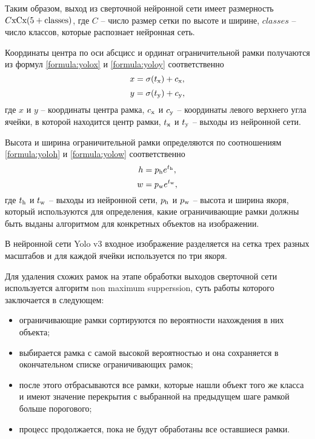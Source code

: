 Таким образом, выход из сверточной нейронной сети имеет размерность $C\rm{x}C\rm{x}(5+classes)$, где $C$ -- число размер сетки по высоте и ширине, $classes$ -- число классов, которые распознает нейронная сеть.

Координаты центра по оси абсцисс и ординат ограничительной рамки получаются из формул \ref{formula:yolox} и \ref{formula:yoloy} соответственно
\begin{equation}\label{formula:yolox}
x = \sigma(t_{\rm{x}}) + c_{\rm{x}},
\end{equation}
\begin{equation}\label{formula:yoloy}
y = \sigma(t_{\rm{y}}) + c_{\rm{y}},
\end{equation}
где $x$ и $y$ -- координаты центра рамка, $c_{\rm{x}}$ и $c_{\rm{y}}$ -- координаты левого верхнего угла ячейки, в которой находится центр рамки, $t_{\rm{x}}$ и $t_{\rm{y}}$ -- выходы из нейронной сети.

Высота и ширина ограничительной рамки определяются по соотношениям \ref{formula:yoloh} и \ref{formula:yolow} соответственно
\begin{equation}\label{formula:yoloh}
h =  p_{\rm{h}}e^{t_{\rm{h}}},
\end{equation}
\begin{equation}\label{formula:yolow}
w =  p_{\rm{w}}e^{t_{\rm{w}}},
\end{equation}
где $t_{\rm{h}}$ и $t_{\rm{w}}$ -- выходы из нейронной сети, $p_{\rm{h}}$ и $p_{\rm{w}}$ -- высота и ширина якоря, который используются для определения, какие ограничивающие рамки должны быть выданы алгоритмом для конкретных объектов на изображении.

В нейронной сети Yolo v3 входное изображение разделяется на сетка трех разных масштабов и для каждой ячейки используется по три якоря.

Для удаления схожих рамок на этапе обработки выходов сверточной сети используется алгоритм non maximum supperssion, суть работы которого заключается в следующем:
\begin{itemize}
	\item ограничивающие рамки сортируются по вероятности нахождения в них объекта;
	\item выбирается рамка с самой высокой вероятностью и она сохраняется в окончательном списке ограничивающих рамок;
	\item после этого отбрасываются все рамки, которые нашли объект того же класса и имеют значение перекрытия с выбранной на предыдущем шаге рамкой больше порогового;
	\item процесс продолжается, пока не будут обработаны все оставшиеся рамки.
\end{itemize}

